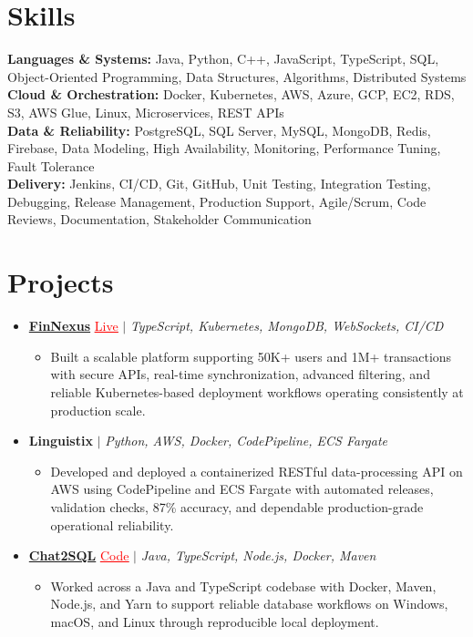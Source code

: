 \documentclass[letterpaper,10pt]{article}
\newcommand{\itemTail}{\vspace{-4pt}}
\newcommand{\sectionGap}{\vspace{-8pt}}
\newcommand{\projGap}{\vspace{3pt}}
\newcommand{\resumeItem}[1]{\item\small{{#1 \itemTail}}}
\newcommand{\resumeProjectHeading}[1]{\item \small #1 \vspace{-2pt}}
\newcommand{\resumeProjectLink}[2]{\href{#1}{\textcolor{red}{\underline{#2}}}}
\newcommand{\resumeSubHeadingListStart}{\begin{itemize}[leftmargin=0.0in, label={}]}
\newcommand{\resumeSubHeadingListEnd}{\end{itemize}}
\newcommand{\resumeProjItemListStart}{\begin{itemize}[leftmargin=0.15in,label=\textbullet,itemsep=3pt,topsep=0pt,parsep=0pt,partopsep=0pt]}
\newcommand{\resumeProjItemListEnd}{\end{itemize}\vspace{-4pt}}
\begin{document}
\section{Skills}
\begin{itemize}[leftmargin=0.15in, label={}]
\small{\item{
\textbf{Languages \& Systems:} Java, Python, C++, JavaScript, TypeScript, SQL, Object-Oriented Programming, Data Structures, Algorithms, Distributed Systems \\
\textbf{Cloud \& Orchestration:} Docker, Kubernetes, AWS, Azure, GCP, EC2, RDS, S3, AWS Glue, Linux, Microservices, REST APIs \\
\textbf{Data \& Reliability:} PostgreSQL, SQL Server, MySQL, MongoDB, Redis, Firebase, Data Modeling, High Availability, Monitoring, Performance Tuning, Fault Tolerance \\
\textbf{Delivery:} Jenkins, CI/CD, Git, GitHub, Unit Testing, Integration Testing, Debugging, Release Management, Production Support, Agile/Scrum, Code Reviews, Documentation, Stakeholder Communication
}}
\end{itemize}
\sectionGap
\section{Projects}
\resumeSubHeadingListStart
\vspace{-2pt}
\resumeProjectHeading{\href{https://fin-nexus.vercel.app/}{\textbf{FinNexus}} \resumeProjectLink{https://fin-nexus.vercel.app/}{Live} $|$ \emph{TypeScript, Kubernetes, MongoDB, WebSockets, CI/CD}}
\resumeProjItemListStart
\resumeItem{Built a scalable platform supporting 50K+ users and 1M+ transactions with secure APIs, real-time synchronization, advanced filtering, and reliable Kubernetes-based deployment workflows operating consistently at production scale.}
\resumeProjItemListEnd
\projGap
\resumeProjectHeading{\textbf{Linguistix} $|$ \emph{Python, AWS, Docker, CodePipeline, ECS Fargate}}
\resumeProjItemListStart
\resumeItem{Developed and deployed a containerized RESTful data-processing API on AWS using CodePipeline and ECS Fargate with automated releases, validation checks, 87\% accuracy, and dependable production-grade operational reliability.}
\resumeProjItemListEnd
\projGap
\resumeProjectHeading{\href{https://github.com/SAHAJ-BHADJA/Chat2SQL}{\textbf{Chat2SQL}} \resumeProjectLink{https://github.com/SAHAJ-BHADJA/Chat2SQL}{Code} $|$ \emph{Java, TypeScript, Node.js, Docker, Maven}}
\resumeProjItemListStart
\resumeItem{Worked across a Java and TypeScript codebase with Docker, Maven, Node.js, and Yarn to support reliable database workflows on Windows, macOS, and Linux through reproducible local deployment.}
\resumeProjItemListEnd
\resumeSubHeadingListEnd
\end{document}
